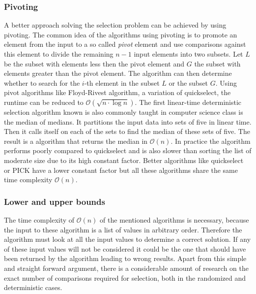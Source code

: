 \documentclass[10pt,journal,compsoc]{IEEEtran}
\begin{document}
\subsubsection{Pivoting}
A better approach solving the selection problem can be achieved by using pivoting. The common idea
of the algorithms using pivoting is to promote an element from the input to a so called
\textit{pivot} element and use comparisons against this element to divide the remaining $n-1$ input
elements into two subsets. Let $L$ be the subset with elements less then the pivot element and $G$
the subset with elements greater than the pivot element. The algorithm can then determine whether to
search for the $i$-th element in the subset $L$ or the subset $G$. Using pivot algorithms like
Floyd-Rivest algorithm, a variation of quickselect, the runtime can be reduced to
$\mathcal{O}(\sqrt{n \cdot \log n})$. The first linear-time deterministic selection algorithm known
is  also commonly taught in computer science class is the median of medians. It partitions the input
data into sets of five in linear time. Then it calls itself on each of the sets to find the median
of these sets of five. The result is a algorithm that returns the median in $\mathcal{O}(n)$. In
practice the algorithm performs poorly compared to quickselect and is also slower than sorting the
list of moderate size due to its high constant factor. Better algorithms like quickselect or PICK
have a lower constant factor but all these algorithms share the same time complexity
$\mathcal{O}(n)$.

\subsubsection{Lower and upper bounds}
The time complexity of $\mathcal{O}(n)$ of the mentioned algorithms is necessary, because the input
to these algorithm is a list of values in arbitrary order. Therefore the algorithm must look at all
the input values to determine a correct solution. If any of these input values will not be
considered it could be the one that should have been returned by the algorithm leading to wrong
results. Apart from this simple and straight forward argument, there is a considerable amount of
research on the exact number of comparisons required for selection, both in the randomized and
deterministic cases.
\end{document}
